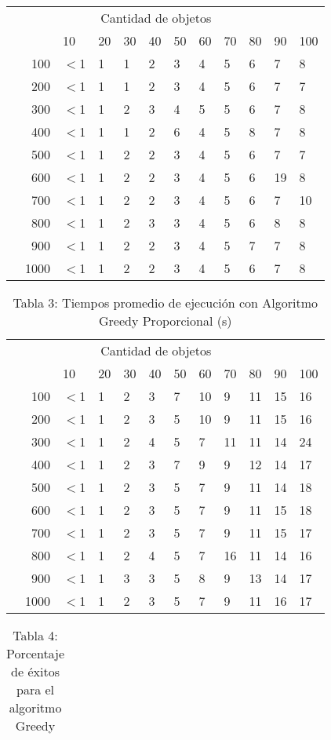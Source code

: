 \documentclass{article}
\begin{document}
\begin{center}
\begin{table}[ht]
\begin{tabularx}{0.8\textwidth}{Xr|XXXXXXXXXX}
&\multicolumn{10}{c}{Cantidad de objetos} \\
&&10&20&30&40&50&60&70&80&90&100\\\hline
\parbox[t]{2mm}{}&100&$<$1&1&1&2&3&4&5&6&7&8\\
&200&$<$1&1&1&2&3&4&5&6&7&7\\
&300&$<$1&1&2&3&4&5&5&6&7&8\\
&400&$<$1&1&1&2&6&4&5&8&7&8\\
&500&$<$1&1&2&2&3&4&5&6&7&7\\
&600&$<$1&1&2&2&3&4&5&6&19&8\\
&700&$<$1&1&2&2&3&4&5&6&7&10\\
&800&$<$1&1&2&3&3&4&5&6&8&8\\
&900&$<$1&1&2&2&3&4&5&7&7&8\\
&1000&$<$1&1&2&2&3&4&5&6&7&8\\
\end{tabularx}
\end{table}
\begin{table}[ht]
\centering
\caption*{Tabla 3: Tiempos promedio de ejecución con Algoritmo Greedy Proporcional (\textmu s)}
\label{3}
\begin{tabularx}{0.8\textwidth}{Xr|XXXXXXXXXX}
&\multicolumn{10}{c}{Cantidad de objetos} \\
&&10&20&30&40&50&60&70&80&90&100\\\hline
\parbox[t]{2mm}{}&100&$<$1&1&2&3&7&10&9&11&15&16\\
&200&$<$1&1&2&3&5&10&9&11&15&16\\
&300&$<$1&1&2&4&5&7&11&11&14&24\\
&400&$<$1&1&2&3&7&9&9&12&14&17\\
&500&$<$1&1&2&3&5&7&9&11&14&18\\
&600&$<$1&1&2&3&5&7&9&11&15&18\\
&700&$<$1&1&2&3&5&7&9&11&15&17\\
&800&$<$1&1&2&4&5&7&16&11&14&16\\
&900&$<$1&1&3&3&5&8&9&13&14&17\\
&1000&$<$1&1&2&3&5&7&9&11&16&17\\
\end{tabularx}
\end{table}
\begin{table}[ht]
\centering
\caption*{Tabla 4: Porcentaje de éxitos para el algoritmo Greedy}
\label{4}
\begin{tabularx}{0.8\textwidth}{Xr|XXXXXXXXXX}

\end{tabularx}
\end{table}
\end{center}
\end{document}
